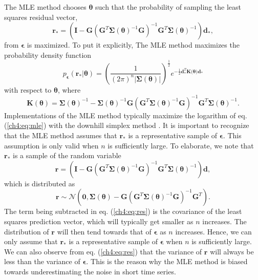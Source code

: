 The MLE method chooses $\mathbf{\theta}$ such that the probability of
sampling the least squares residual vector,
\begin{equation}
  \mathbf{r}_* =  \left(\mathbf{I} - 
                  \mathbf{G}\left(\mathbf{G}^T\mathbf{\Sigma}(\mathbf{\theta})^{-1}
                  \mathbf{G}\right)^{-1}\mathbf{G}^T\mathbf{\Sigma}(\mathbf{\theta})^{-1}\right)
                  \mathbf{d_*},
\end{equation}  
from $\mathbf{\epsilon}$ is maximized. To put it explicitly, The MLE
method maximizes the probability density function
\begin{equation}\label{ch4:eq:mle}
p_\mathbf{\epsilon}(\mathbf{r}_*|\mathbf{\theta}) = 
\left(\frac{1}{(2\pi)^n\left| \mathbf{\Sigma}(\mathbf{\theta}) \right|}\right)^{\frac{1}{2}} 
e^{-\tfrac{1}{2}\mathbf{d}_*^T\mathbf{K(\mathbf{\theta}})\mathbf{d}_*}
\end{equation}
with respect to $\mathbf{\theta}$, where
\begin{equation}
\mathbf{K}(\mathbf{\theta}) = \mathbf{\Sigma}(\mathbf{\theta})^{-1} - 
                              \mathbf{\Sigma}(\mathbf{\theta})^{-1}\mathbf{G}
                              \left(\mathbf{G}^T\mathbf{\Sigma}(\mathbf{\theta})^{-1}\mathbf{G}\right)^{-1}
                              \mathbf{G}^T\mathbf{\Sigma}(\mathbf{\theta})^{-1}.
\end{equation}
Implementations of the MLE method typically maximize the logarithm of
eq. (\ref{ch4:eq:mle}) with the downhill simplex method
\citep{Press2007}. It is important to recognize that the MLE method
assumes that $\mathbf{r}_*$ is a representative sample of
$\mathbf{\epsilon}$. This assumption is only valid when $n$ is
sufficiently large. To elaborate, we note that $\mathbf{r_*}$ is a
sample of the random variable
\begin{equation}
  \mathbf{r} =  \left(\mathbf{I} - 
                \mathbf{G}\left(\mathbf{G}^T\mathbf{\Sigma}(\mathbf{\theta})^{-1}\mathbf{G}\right)^{-1}
                \mathbf{G}^T\mathbf{\Sigma}(\mathbf{\theta})^{-1}\right)\mathbf{d},
\end{equation}  
which is distributed as
\begin{equation}\label{ch4:eq:res}
  \mathbf{r} \sim \mathcal{N}\left(\mathbf{0},
                  \mathbf{\Sigma}(\mathbf{\theta}) - 
                  \mathbf{G}\left(\mathbf{G}^T\mathbf{\Sigma}(\mathbf{\theta})^{-1}
                  \mathbf{G}\right)^{-1}\mathbf{G}^T\right).
\end{equation}
The term being subtracted in eq. (\ref{ch4:eq:res}) is the covariance
of the least squares prediction vector, which will typically get
smaller as $n$ increases. The distribution of $\mathbf{r}$ will then
tend towards that of $\mathbf{\epsilon}$ as $n$ increases. Hence, we
can only assume that $\mathbf{r}_*$ is a representative sample of
$\mathbf{\epsilon}$ when $n$ is sufficiently large. We can also
observe from eq. (\ref{ch4:eq:res}) that the variance of $\mathbf{r}$
will always be less than the variance of $\mathbf{\epsilon}$. This is
the reason why the MLE method is biased towards underestimating the
noise in short time series.

